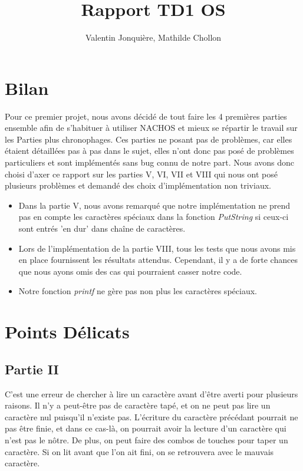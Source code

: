 \documentclass{article}
\author{
    Valentin Jonquière,
    Mathilde Chollon
}
\title{Rapport TD1 OS}
\begin{document}
\maketitle

\pagebreak

\tableofcontents

\pagebreak

\section{Bilan}

Pour ce premier projet, nous avons décidé de tout faire les 4 premières parties ensemble afin de
s'habituer à utiliser NACHOS et mieux se répartir le travail sur les Parties plus chronophages.
Ces parties ne posant pas de problèmes, car elles étaient détaillées pas à pas dans le sujet, elles n'ont
donc pas posé de problèmes particuliers et sont implémentés sans bug connu de notre part. Nous avons donc choisi
d'axer ce rapport sur les parties V, VI, VII et VIII qui nous ont posé plusieurs problèmes et demandé des choix 
d'implémentation non triviaux. 
\linebreak
\begin{itemize}
    \item Dans la partie V, nous avons remarqué que notre implémentation ne prend pas en compte les caractères spéciaux dans la fonction \textit{PutString} si ceux-ci
    sont entrés 'en dur' dans chaîne de caractères.
    \item Lors de l'implémentation de la partie VIII, tous les tests que nous avons mis en place fournissent les résultats attendus. Cependant, il y a de forte 
    chances que nous ayons omis des cas qui pourraient casser notre code.
    \item Notre fonction \textit{printf} ne gère pas non plus les caractères spéciaux.
\end{itemize}
\section{Points Délicats}
\subsection{Partie II}
C'est une erreur de chercher à lire un caractère avant d'être averti pour
plusieurs raisons. Il n'y a peut-être pas de caractère tapé, et on ne peut pas
lire un caractère nul puisqu'il n'existe pas. L'écriture du caractère précédant
pourrait ne pas être finie, et dans ce cas-là, on pourrait avoir la lecture
d'un caractère qui n'est pas le nôtre. De plus, on peut faire des combos de
touches pour taper un caractère. Si on lit avant que l'on ait fini, on se
retrouvera avec le mauvais caractère.
\end{document}
